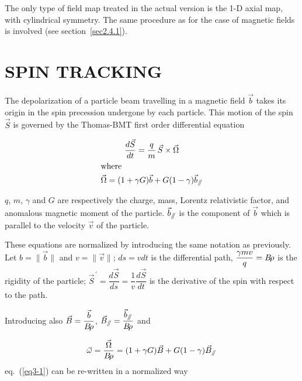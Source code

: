 \noindent The only type of field map treated in the actual version is the 
1-D axial map, with cylindrical symmetry. The same procedure as 
for the case of magnetic fields is involved (see section~\ref{sec2.4.1}). 


\clearemptydoublepage

\section[SPIN TRACKING]{SPIN TRACKING~\protect\cite{Biblio7}}\label{sec3}   %

\renewcommand\theequation{\thesection.\arabic{equation}}
\makeatletter
{}
\makeatother

The depolarization of a particle beam travelling in a 
magnetic field $ \vec  b $ takes its origin in the spin  
precession undergone by each particle. This motion of the spin $ \vec  S $ 
is governed by the Thomas-BMT first order differential equation~\cite{Biblio8}       %


\begin{gather}
	\dfrac{d\vec  S }{ dt} = \dfrac{q }{  m} \, \vec  S\times\vec  \Omega
	     \label{eq3-1}  \\
\intertext{where}
	\vec  \Omega  = (1+\gamma G)\vec  b + G(1-\gamma )\vec  b_{\mathrel{/\kern-.25em/}} \label{eq3-2} 
\end{gather}

\noindent$ q$, $m$, $\gamma$ and $ G $ are respectively the charge, 
mass, Lorentz relativistic factor, and anomalous magnetic moment of the 
particle. $ \vec  b_{\mathrel{/\kern-.25em/}} $ is the component of $ \vec  b $ which is
parallel to the velocity $ \vec  v $ of the particle. 

\noindent These equations are normalized by introducing the same notation 
as previously. Let $ b=\parallel\vec  b\parallel $ and $ v=\parallel\vec v\parallel$;  
$ ds=vdt $ is the differential path, $ \dfrac{\gamma mv }{ q} = B\!\rho $ is the
rigidity of the particle; 
$ \vec  S^{\,\prime} = \dfrac{d\vec  S }{ ds} = \dfrac{1 }{ v}\dfrac{d\vec  S }{ dt} $ 
is the derivative of the spin with respect to the path. 

\noindent Introducing also $ \vec  B= \dfrac{\vec  b }{ B\!\rho} $, 
$ \vec B_{\mathrel{/\kern-.25em/}} = \dfrac{\vec  b_{\mathrel{/\kern-.25em/}} }{ B\!\rho} $  and

\begin{equation}
	\vec  \omega  = \frac{\vec \Omega }{ B\!\rho}  = (1+\gamma G)\vec  B +
	G(1-\gamma )\vec  B_{\mathrel{/\kern-.25em/}}
	\label{eq3-3}
\end{equation}
%
eq.~(\ref{eq3-1}) can be re-written in a normalized way

